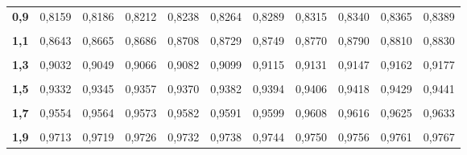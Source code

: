 \documentclass[
  11pt,
  ngerman,
  a4paper,
]{report}
\begin{document}
\begin{table}[!h]
{\begin{tabular}{>{}r|rrrrrrrrrr}
\textbf{0,9} & 0,8159 & 0,8186 & 0,8212 & 0,8238 & 0,8264 & 0,8289 & 0,8315 & 0,8340 & 0,8365 & 0,8389\\
\addlinespace
\textbf{\cellcolor{gray!6}{1,0}} & \cellcolor{gray!6}{0,8413} & \cellcolor{gray!6}{0,8438} & \cellcolor{gray!6}{0,8461} & \cellcolor{gray!6}{0,8485} & \cellcolor{gray!6}{0,8508} & \cellcolor{gray!6}{0,8531} & \cellcolor{gray!6}{0,8554} & \cellcolor{gray!6}{0,8577} & \cellcolor{gray!6}{0,8599} & \cellcolor{gray!6}{0,8621}\\
\textbf{1,1} & 0,8643 & 0,8665 & 0,8686 & 0,8708 & 0,8729 & 0,8749 & 0,8770 & 0,8790 & 0,8810 & 0,8830\\
\textbf{\cellcolor{gray!6}{1,2}} & \cellcolor{gray!6}{0,8849} & \cellcolor{gray!6}{0,8869} & \cellcolor{gray!6}{0,8888} & \cellcolor{gray!6}{0,8907} & \cellcolor{gray!6}{0,8925} & \cellcolor{gray!6}{0,8944} & \cellcolor{gray!6}{0,8962} & \cellcolor{gray!6}{0,8980} & \cellcolor{gray!6}{0,8997} & \cellcolor{gray!6}{0,9015}\\
\textbf{1,3} & 0,9032 & 0,9049 & 0,9066 & 0,9082 & 0,9099 & 0,9115 & 0,9131 & 0,9147 & 0,9162 & 0,9177\\
\textbf{\cellcolor{gray!6}{1,4}} & \cellcolor{gray!6}{0,9192} & \cellcolor{gray!6}{0,9207} & \cellcolor{gray!6}{0,9222} & \cellcolor{gray!6}{0,9236} & \cellcolor{gray!6}{0,9251} & \cellcolor{gray!6}{0,9265} & \cellcolor{gray!6}{0,9279} & \cellcolor{gray!6}{0,9292} & \cellcolor{gray!6}{0,9306} & \cellcolor{gray!6}{0,9319}\\
\addlinespace
\textbf{1,5} & 0,9332 & 0,9345 & 0,9357 & 0,9370 & 0,9382 & 0,9394 & 0,9406 & 0,9418 & 0,9429 & 0,9441\\
\textbf{\cellcolor{gray!6}{1,6}} & \cellcolor{gray!6}{0,9452} & \cellcolor{gray!6}{0,9463} & \cellcolor{gray!6}{0,9474} & \cellcolor{gray!6}{0,9484} & \cellcolor{gray!6}{0,9495} & \cellcolor{gray!6}{0,9505} & \cellcolor{gray!6}{0,9515} & \cellcolor{gray!6}{0,9525} & \cellcolor{gray!6}{0,9535} & \cellcolor{gray!6}{0,9545}\\
\textbf{1,7} & 0,9554 & 0,9564 & 0,9573 & 0,9582 & 0,9591 & 0,9599 & 0,9608 & 0,9616 & 0,9625 & 0,9633\\
\textbf{\cellcolor{gray!6}{1,8}} & \cellcolor{gray!6}{0,9641} & \cellcolor{gray!6}{0,9649} & \cellcolor{gray!6}{0,9656} & \cellcolor{gray!6}{0,9664} & \cellcolor{gray!6}{0,9671} & \cellcolor{gray!6}{0,9678} & \cellcolor{gray!6}{0,9686} & \cellcolor{gray!6}{0,9693} & \cellcolor{gray!6}{0,9699} & \cellcolor{gray!6}{0,9706}\\
\textbf{1,9} & 0,9713 & 0,9719 & 0,9726 & 0,9732 & 0,9738 & 0,9744 & 0,9750 & 0,9756 & 0,9761 & 0,9767\\

\end{tabular}}
\end{table}
\end{document}

